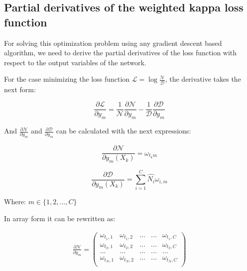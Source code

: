 \documentclass[times,twocolumn,final,authoryear]{elsarticle}
\begin{document}
\subsection{Partial derivatives of the weighted kappa loss function}

For solving this optimization problem using any gradient descent based algorithm, we need to derive the partial derivatives of the loss function with respect to the output variables of the network. 

For the case minimizing the loss function $\mathcal{L} = \log{ \frac{\mathcal{N}}{\mathcal{D}}}$, the derivative takes the next form:

\begin{equation}
\frac{\partial \mathcal{L}}{\partial y_m} = \frac{1}{\mathcal{N}}\frac{\partial \mathcal{N}}{\partial y_m} - \frac{1}{\mathcal{D}}
\frac{\partial{\mathcal{D}}}{\partial y_m}
\end{equation}

And $\frac{\partial \mathcal{N}}{\partial y_m}$ and $\frac{\partial{\mathcal{D}}}{\partial y_m}$ can be calculated with the next expressions:

\begin{equation}
\frac{\partial \mathcal{N}}{\partial y_m(X_k)} = \omega_{t_k m}
\end{equation}

\begin{equation}
\frac{\partial \mathcal{D}}{\partial y_m(X_k)} = \sum_{i=1}^{C} \hat{N_i} \omega_{i,m}
\end{equation}

Where:  $m \in \{1, 2, ..., C\}$

In array form it can be rewritten as:

\begin{equation}
\begin{aligned}
\frac{\partial \mathcal{N}}{\partial y_m} =
\begin{pmatrix} 
\omega_{t_1, 1}     & \omega_{t_1, 2}     & ...     & ... & \omega_{t_1, C}\\ 
\omega_{t_2, 1}     & \omega_{t_2, 2}     & ...     & ... & \omega_{t_2, C}\\ 
...					& ...		          & ...     & ... & ...\\
\omega_{t_N, 1}     & \omega_{t_N, 2}     & ...     & ... & \omega_{t_N, C}\\  
\end{pmatrix}
\end{aligned}
\end{equation}
\end{document}
